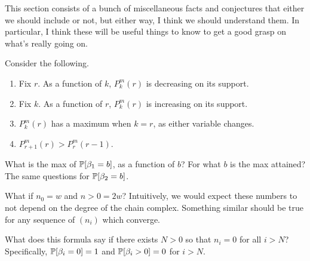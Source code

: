 
This section consists of a bunch of miscellaneous facts and conjectures that
either we should include or not, but either way, I think we should understand
them. In particular, I think these will be useful things to know to get a good
grasp on what's really going on. 

\begin{conjecture}
 Consider the following.
  \begin{enumerate}
    \item Fix $r$. As a function of $k$, $P^m_k(r)$ is decreasing on its support.
    \item Fix $k$. As a function of $r$, $P^m_k(r)$ is increasing on its support.
    \item $P^m_k(r)$ has a maximum when $k = r$, as either variable changes.
    \item $P^m_{r+1}(r) > P^m_r(r-1)$.
  \end{enumerate}
\end{conjecture}

\begin{question} 
  What is the max of $\mathbb{P}[\beta_1=b]$, as a function of $b$? For
  what $b$ is the max attained? The same questions for $\mathbb{P}[\beta_2=b]$.
\end{question}

\begin{question}
  What if $n_0 = w$ and $n>0 = 2w$? Intuitively, we would expect these numbers
  to not depend on the degree of the chain complex. Something similar should
  be true for any sequence of $(n_i)$ which converge.
\end{question}

\begin{question}
  What does this formula say if there exists $N >0$ so that $n_i=0$ for 
  all $i > N$? Specifically, $\mathbb{P}[\beta_i=0] = 1$ and $\mathbb{P}[\beta_i > 0]= 0$ 
  for $i>N$.
\end{question}

